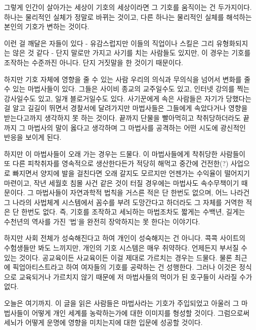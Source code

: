 \vspace{5mm}

그렇게 인간이 살아가는 세상이 기호의 세상이라면
그 기호를 움직이는 건 두가지이다.
하나는 물리적인 실체가 정말로 바뀌는 것이고,
다른 하나는 물리적인 실체를 해석하는 본인의 기호가 변하는 것이다.
\vspace{5mm}

이런 걸 깨달은 자들이 있다 - 유감스럽지만 이들의 직업이나 스킬은 그리 유형화되지는 않은 것 같다 -
단지 말로만 가지고 사기를 치는 사람들도 있지만, 이 경우는 기호를 조작하는 수준까진 아니다. 단지 거짓말을 한 것이기 때문이다.
\vspace{5mm}

하지만 기호 자체에 영향을 줄 수 있는 사람
우리의 의식과 무의식을 넘어서 변화를 줄 수 있는 마법사들이 있다.
그들은 사이비 종교의 교주일수도 있고, 인터넷 강의를 찍는 강사일수도 있고, 일개 블로거일수도 있다.
사기꾼에게 속은 사람들은 자기가 당했다는 걸 알고 길길이 뛰면서 경찰서에 달려가지만
마법사들은 그들에게 속았다거나 영향을 받는다고까지 생각하지 못 하는 것이다.
끝까지 단물을 빨아먹히고 착취당하더라도 끝까지 그 마법사의 말이 옳다고 생각하며
그 마법사를 공격하는 어떤 시도에 광신적인 반응을 보이게 된다.
\vspace{5mm}

하지만 이 마법사들이 오래 가는 경우는 드물다.
이 마법사들에게 착취당한 사람들이 또 다른 피착취자를 영속적으로 생산한다든가
적당히 해먹고 중간에 건전한(?) 사업으로 빠지면서 양지에 발을 걸친다면 오래 갈지도 모르지만
언젠가는 수익율이 떨어지기 마련이고, 작년 세월호 침몰 사건 같은 것이 터질 경우에는 마법사도 속수무책이기 때문이다.
그 마법사들이 자연과학적 법칙을 거스른 적은 단 한번도 없으며,
어느 나라건 그 나라의 사법체계 시스템에서 꼼수를 부려 도망간다고 하더라도 그 자체를 거역한 적은 단 한번도 없다.
즉, 기호를 조작하고 세뇌하는 마법조차도 짧게는 수백년, 길게는 수천년의 역사를 가진 '법'을 완전히 장악하지는 못 한다는 이야기다.
\vspace{5mm}

하지만 사회 전체가 성숙해진다고 하여 개인이 성숙해지는 건 아니다.
콕콕 사이트의 수험생들만 봐도 느끼지만, 개인의 기호 시스템은 매우 취약하다. 언제든지 부서질 수 있는 것이다.
공교육이든 사교육이든 이걸 제대로 가르치는 경우는 드물다. 물론 최근에 픽업아티스트라고 하여 여자들의 기호를 공략하는 건 성행한다.
그러나 이것은 정식으로 교육되거나 가르치지 않기 때문에 저 마법사들의 먹이가 된 호구들이 사라질 수가 없다.
\vspace{5mm}

오늘은 여기까지.
이 글을 읽은 사람들은 마법사라는 기호가 주입되었고
아울러 그 마법사들이 어떻게 개인 세계를 농락하는가에 대한 이미지를 형성할 것이다.
그럼으로써 세뇌가 어떻게 운명에 영향을 미치는지에 대한 입문에 성공할 것이다.
\vspace{5mm}






